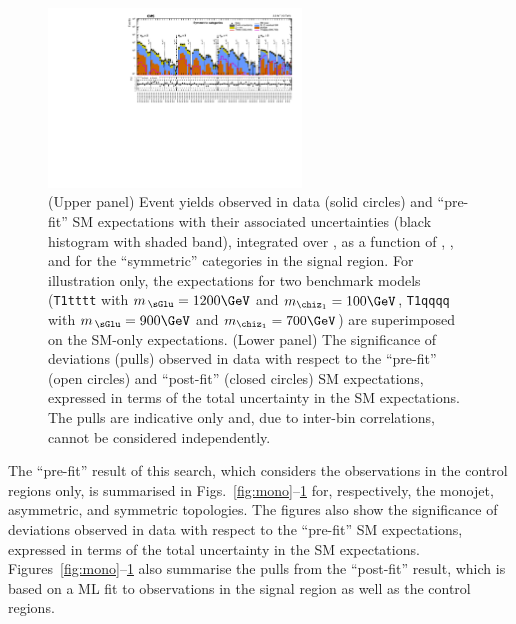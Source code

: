 \begin{figure}[!h]
  \begin{center}
    \includegraphics[angle=90,width=0.6\textwidth]{figures/result/v2/summaryPlot_Symmetric_prefit_overlay_fit_b}
    \caption{(Upper panel) Event yields observed in data (solid
      circles) and ``pre-fit'' SM expectations with their associated
      uncertainties (black histogram with shaded band), integrated
      over \HTmiss, as a function of \njet, \nb, and \scalht for the
      ``symmetric'' \njet categories in the signal region. For
      illustration only, the expectations for two benchmark models
      (\texttt{T1tttt} with $m_{\,\sGlu} = 1200\GeV$ and $m_{\chiz_1}
      = 100\GeV$, \texttt{T1qqqq} with $m_{\,\sGlu} = 900\GeV$ and
      $m_{\chiz_1} = 700\GeV$) are superimposed on the SM-only
      expectations. (Lower panel) The significance of deviations
      (pulls) observed in data with respect to the ``pre-fit'' (open
      circles) and ``post-fit'' (closed circles) SM expectations,
      expressed in terms of the total uncertainty in the SM
      expectations. The pulls are indicative only and, due to
      inter-bin correlations, cannot be considered independently.}
    \label{fig:sym}
  \end{center}
\end{figure}

The ``pre-fit'' result of this search, which considers the
observations in the control regions only, is summarised in
Figs.~\ref{fig:mono}--\ref{fig:sym} for, respectively, the monojet,
asymmetric, and symmetric topologies.
The figures also show the significance of deviations observed in data
with respect to the ``pre-fit'' SM expectations, expressed in terms of
the total uncertainty in the SM
expectations. Figures~\ref{fig:mono}--\ref{fig:sym} also summarise the
pulls from the ``post-fit'' result, which is based on a ML fit to
observations in the signal region as well as the control regions.

